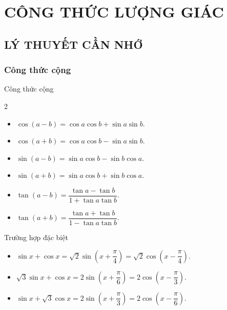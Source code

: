 \setcounter{section}{1}
\section{CÔNG THỨC LƯỢNG GIÁC}
\subsection{LÝ THUYẾT CẦN NHỚ}
\subsubsection{Công thức cộng}
\begin{khung4}{Công thức cộng}
	\begin{multicols}{2}
		\begin{itemize}
			\item $\cos (a-b) = \cos a \cos b + \sin a\sin b$.
			\item $\cos (a+b) = \cos a \cos b - \sin a\sin b$.
			\item $\sin (a-b) = \sin a \cos b - \sin b \cos a$.
			\item $\sin (a+b) = \sin a \cos b + \sin b \cos a$.
			\item $\tan (a-b) = \dfrac{\tan a - \tan b}{1+\tan a \tan b}$.
			\item $\tan (a+b) = \dfrac{\tan a + \tan b}{1-\tan a \tan b}$.
		\end{itemize}
	\end{multicols}
\end{khung4}
\begin{khung4}{Trường hợp đặc biệt}
	\begin{itemize}
		\item $\sin x + \cos x = \sqrt{2}\sin\left(x+\dfrac{\pi}{4}\right) = \sqrt{2}\cos \left(x-\dfrac{\pi}{4}\right)$.
		\item $\sqrt{3}\sin x + \cos x = 2\sin \left(x+\dfrac{\pi}{6}\right) = 2\cos \left(x-\dfrac{\pi}{3}\right)$.
		\item $\sin x + \sqrt{3}\cos x = 2\sin \left(x+ \dfrac{\pi}{3}\right) = 2\cos \left(x-\dfrac{\pi}{6}\right)$.
	\end{itemize}
\end{khung4}

